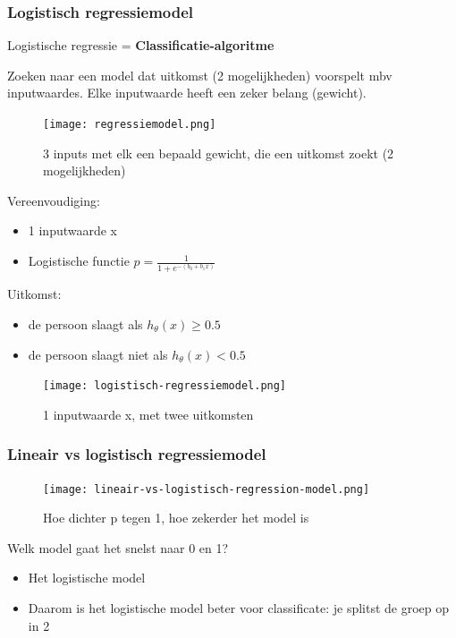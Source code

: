 \documentclass{article}
\begin{document}
\subsubsection{Logistisch regressiemodel}

Logistische regressie = \textbf{Classificatie-algoritme}

Zoeken naar een model dat uitkomst (2 mogelijkheden) voorspelt mbv inputwaardes.
Elke inputwaarde heeft een zeker belang (gewicht).

\begin{figure}[H]
    \centering
    \texttt{[image: regressiemodel.png]}
    \caption{3 inputs met elk een bepaald gewicht, die een uitkomst zoekt (2 mogelijkheden)}
\end{figure}

Vereenvoudiging:  

\begin{itemize}
    \item 1 inputwaarde x
    \item Logistische functie $p = \frac{1}{1 + e^{-(b_0+b_1x)}}$
\end{itemize}

Uitkomst:

\begin{itemize}
    \item de persoon slaagt als $h_{\theta}(x) \geq 0.5$
    \item de persoon slaagt niet als $h_{\theta}(x) < 0.5$
\end{itemize}

\begin{figure}[H]
    \centering
    \texttt{[image: logistisch-regressiemodel.png]}
    \caption{1 inputwaarde x, met twee  uitkomsten}
\end{figure}

\subsubsection{Lineair vs logistisch regressiemodel}

\begin{figure}[H]
    \centering
    \texttt{[image: lineair-vs-logistisch-regression-model.png]}
    \caption{Hoe dichter p tegen 1, hoe zekerder het model is}
\end{figure}

Welk model gaat het snelst naar 0 en 1? 

\begin{itemize}
    \item Het logistische model
    \item Daarom is het logistische model beter voor classificate: je splitst de groep op in 2
\end{itemize}
\end{document}

